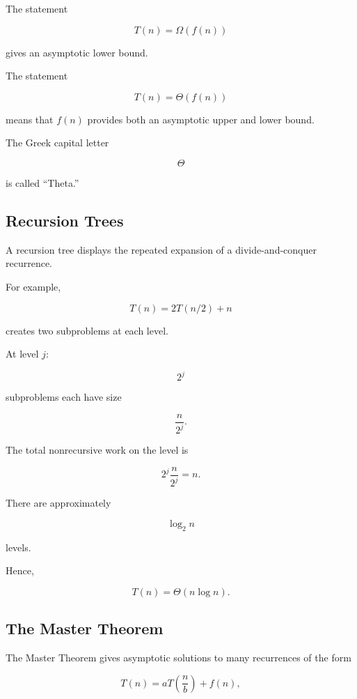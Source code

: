 The statement

\[
T(n)=\Omega(f(n))
\]

gives an asymptotic lower bound.

The statement

\[
\boxed{
T(n)=\Theta(f(n))
}
\]

means that \(f(n)\) provides both an asymptotic upper and lower bound.

The Greek capital letter

\[
\Theta
\]

is called ``Theta.''

\subsection{Recursion Trees}
\label{subsec:recursion-trees}

A recursion tree displays the repeated expansion of a divide-and-conquer
recurrence.

For example,

\[
T(n)=2T(n/2)+n
\]

creates two subproblems at each level.

At level \(j\):

\[
2^j
\]

subproblems each have size

\[
\frac{n}{2^j}.
\]

The total nonrecursive work on the level is

\[
2^j\frac{n}{2^j}
=
n.
\]

There are approximately

\[
\log_2 n
\]

levels.

Hence,

\[
\boxed{
T(n)=\Theta(n\log n).
}
\]

\subsection{The Master Theorem}
\label{subsec:master-theorem}

The Master Theorem gives asymptotic solutions to many recurrences of
the form

\[
\boxed{
T(n)
=
aT\left(\frac nb\right)
+
f(n),
}
\]

